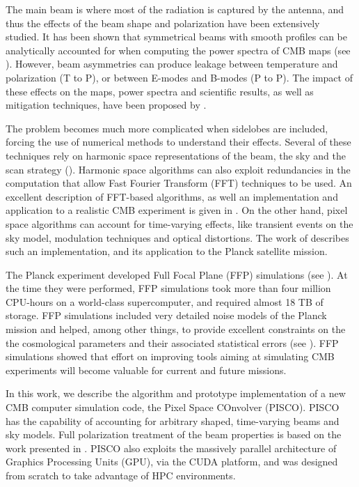 \documentclass[a4paper,fleqn]{cas-dc}\sloppy
\begin{document}
	The main beam is where most of the radiation is captured by the antenna, and thus the effects of the beam shape and polarization have been extensively studied. 
	It has been shown that symmetrical beams with smooth profiles can be analytically accounted for when computing the power spectra of CMB maps (see \cite{2003ApJS..148...39P}).
	However, beam asymmetries can produce leakage between temperature and polarization (T to P), or between E-modes and B-modes (P to P). The impact of these effects on the maps, power spectra and scientific results, as well as mitigation techniques, have been proposed by \cite{PhysRevD.77.083003, 2007MNRAS.376.1767O, 2015JCAP...03..048D}.
	
	The problem becomes much more complicated when sidelobes are included, forcing the use of numerical methods to understand their effects.
	Several of these techniques rely on harmonic space representations of the beam, the sky and the scan strategy (\cite{2001PhRvD..63l3002W,2000PhRvD..62l3002C}). Harmonic space algorithms can also exploit redundancies in the computation that allow Fast Fourier Transform (FFT) techniques to be used. An excellent description of FFT-based algorithms, as well an implementation and application to a realistic CMB experiment is given in \cite{2018arXiv180905034D}. On the other hand, pixel space algorithms can account for time-varying effects, like transient events on the sky model, modulation techniques and optical distortions. The work of \cite{2011ApJS..193....5M} describes such an implementation, and its application to the Planck satellite mission.
	
	The Planck experiment developed Full Focal Plane (FFP) simulations (see \cite{2016A&A...594A..12P}). At the time they were performed, FFP simulations took more than four million CPU-hours on a world-class supercomputer, and required almost 18 TB of storage. FFP simulations included very detailed noise models of the Planck mission and helped, among other things, to provide excellent constraints on the the cosmological parameters and their associated statistical errors (see \cite{2016A&A...594A..13P}). FFP simulations showed that effort on improving tools aiming at simulating CMB experiments will become valuable for current and future missions.
	
	
	
	
	In this work, we describe the algorithm and prototype implementation of a new CMB computer simulation code, the Pixel Space COnvolver (PISCO). PISCO has the capability of accounting for arbitrary shaped, time-varying beams and sky models. Full polarization treatment of the beam properties is based on the work presented in \cite{2007MNRAS.376.1767O}. PISCO also exploits the massively parallel architecture of Graphics Processing Units (GPU), via the CUDA platform, and was designed from scratch to take advantage of HPC environments.
	
\end{document}
